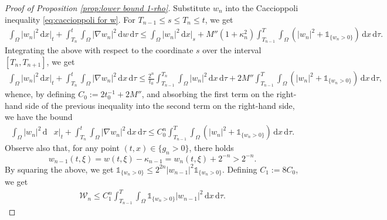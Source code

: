 \documentclass[11pt,a4paper,reqno]{amsart}
\theoremstyle{remark}
\theoremstyle{definition}
\numberwithin{equation}{section}
\newcommand{\bxi}{\xi}
\renewcommand{\d}{\, \mathrm{d} }
\begin{document}
\begin{proof}[Proof of Proposition \ref{prop:lower bound 1-rho}]
Substitute $w_{n}$ into the Caccioppoli inequality \eqref{eq:caccioppoli for w}. For $T_{n-1} \leq s \leq T_{n} \leq t$, we get 
    \begin{equation*}
            \begin{aligned}
            \int_{\Omega} \!|w_{n}|^2 \d x \bigg|_{t} \!\!+\!\! \int_{T_{n}}^t \! \int_{\Omega} \!\!|\nabla w_{n} |^2 \d w \d \tau \leq \!\! \int_{\Omega}\! |w_{n}|^2 \d x \bigg|_{s}  \!\!\!+\! M''(1\!+\!\kappa_{n}^2)\!\! \int_{T_{n-1}}^T \!\!\int_{\Omega} \!\!(|w_{n}|^2 \!+\! \mathds{1}_{\{w_{n} >0\}}) \d x \d \tau. 
        \end{aligned}
\end{equation*}
    Integrating the above with respect to the coordinate $s$ over the interval $[T_n,T_{n+1}]$, we get 
        \begin{equation*}
            \begin{aligned}
         \int_{\Omega}\!\! |w_n|^2 \! \d x \bigg|_{t} \!\!+\!\! \int_{T_{n}}^t\!\! \int_{\Omega}\!\! |\nabla w_n |^2 \d x \d \tau \!   \leq \! \frac{2^{n}}{t_0}\!\! \int_{T_{n-1}}^{T_{n}}\!\!\int_{\Omega}\!\! |w_n|^2 \d x \d \tau \!+\! 2M'' \!\!\!\int_{T_{n-1}}^T\!\! \int_{\Omega}\!\! (|w_n|^2 \!+\! \mathds{1}_{\{w_n >0\}})\! \d x\! \d \tau, 
        \end{aligned}
\end{equation*}
whence, by defining $C_0 := 2t_0^{-1} + 2M''$, and absorbing the first term on the right-hand side of the previous inequality into the second term on the right-hand side, we have the bound 
        \begin{equation*}
            \begin{aligned}
         \int_{\Omega} |w_n|^2 \d & x \bigg|_{t} + \int_{T_{n}}^t \int_{\Omega} |\nabla w_n |^2 \d x \d \tau \leq C_0^n \int_{T_{n-1}}^T \int_{\Omega} (|w_n|^2 + \mathds{1}_{\{w_n >0\}}) \d x \d \tau. 
        \end{aligned}
\end{equation*}
Observe also that, for any point $(t,x) \in \{g_n > 0\}$, there holds 
\begin{equation}\label{eq:to get from fn-1 to fn for w}
    w_{n-1}(t,\bxi) = w(t,\bxi) - \kappa_{n-1} = w_n(t,\bxi) + 2^{-n} > 2^{-n}. 
\end{equation}
By squaring the above, we get $\mathds{1}_{\{w_n > 0\}}\! \leq\! 2^{2n} |w_{n-1}|^2 \mathds{1}_{\{w_n>0\}}$. Defining $C_1 := 8C_0$, we get 
    \begin{equation}\label{eq:some of the way there moser for w}
            \begin{aligned}
         \mathscr{W}_n \leq C_1^n \int_{T_{n-1}}^T \int_{\Omega} \mathds{1}_{\{w_n > 0\}} |w_{n-1}|^2 \d x \d \tau. 
        \end{aligned}
\end{equation}



\end{proof}
\end{document}
